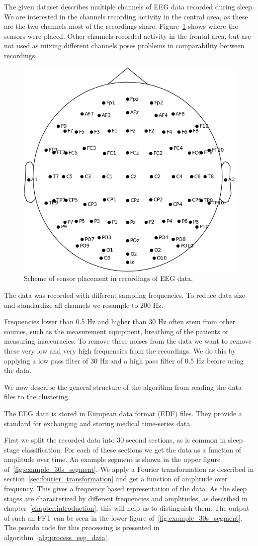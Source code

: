 The given dataset describes multiple channels of EEG data recorded during sleep. We are interested in the channels recording activity in the central area, as these are the two channels most of the recordings share. Figure~\ref{fig:head_placement} shows where the sensors were placed. Other channels recorded activity in the frontal area, but are not used as mixing different channels poses problems in comparability between recordings.

\begin{figure}[h]
	\centering
	\includegraphics[width=0.6\linewidth]{figs/head_placement}
	\caption{Scheme of sensor placement in recordings of EEG data.}
	\label{fig:head_placement}
\end{figure}

\newpage
The data was recorded with different sampling frequencies. To reduce data size and standardize all channels we resample to 200 Hz.

Frequencies lower than 0.5 Hz and higher than 30 Hz often stem from other sources, such as the measurement equipment, breathing of the patients or measuring inaccuracies. To remove these noises from the data we want to remove these very low and very high frequencies from the recordings. We do this by applying a low pass filter of 30 Hz and a high pass filter of 0.5 Hz before using the data.

We now describe the general structure of the algorithm from reading the data files to the clustering.

The EEG data is stored in European data format (EDF) files. They provide a standard for exchanging and storing medical time-series data.

First we split the recorded data into 30 second sections, as is common in sleep stage classification. For each of these sections we get the data as a function of amplitude over time. An example segment is shown in the upper figure of~\ref{fig:example_30s_segment}. We apply a Fourier transformation as described in section~\ref{sec:fourier_transformation} and get a function of amplitude over frequency. This gives a frequency based representation of the data. As the sleep stages are characterized by different frequencies and amplitudes, as described in chapter~\ref{chapter:introduction}, this will help us to distinguish them. The output of such an FFT can be seen in the lower figure of~\ref{fig:example_30s_segment}. The pseudo code for this processing is presented in algorithm~\ref{alg:process_eeg_data}.

